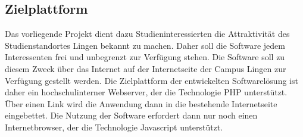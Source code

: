\subsection{Zielplattform}
\label{sec:Zielplattform}

Das vorliegende Projekt dient dazu Studieninteressierten die Attraktivität des Studienstandortes Lingen bekannt zu machen. Daher soll die Software jedem Interessenten frei und unbegrenzt zur Verfügung stehen.
Die Software soll zu diesem Zweck über das Internet auf der Internetseite der Campus Lingen zur Verfügung gestellt werden.
Die Zielplattform der entwickelten Softwarelösung ist daher ein hochschulinterner Webserver, der die Technologie PHP unterstützt.
Über einen Link wird die Anwendung dann in die bestehende Internetseite eingebettet.
Die Nutzung der Software erfordert dann nur noch einen Internetbrowser, der die Technologie Javascript unterstützt.

